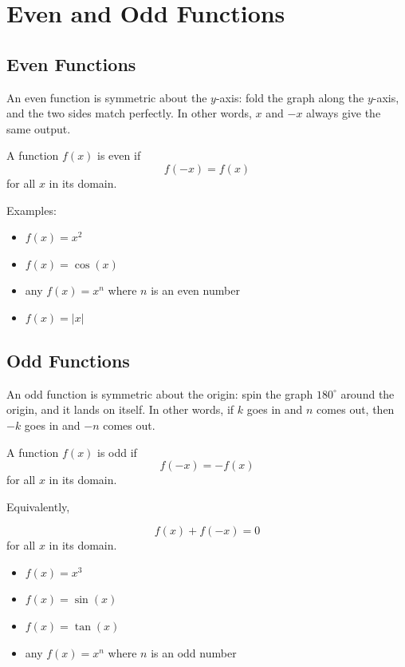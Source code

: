 
\section{Even and Odd Functions}


\subsection{Even Functions}

An even function is symmetric about the $y$-axis:
fold the graph along the $y$-axis, and the two sides match perfectly. In
other words, $x$ and $-x$ always give the same output.


\begin{mdframed}[style=important, frametitle={Even Functions}]

  A function \( f(x) \) is even if
  \[
    f(-x) = f(x)
  \]
  for all \( x \) in its domain.
\end{mdframed}
Examples:
\begin{itemize}
  \item \( f(x) = x^2 \)
  \item \( f(x) = \cos(x) \)
  \item any \( f(x) = x^n \) where \( n \) is an even number
  \item \( f(x) = |x| \)
\end{itemize}

\subsection{Odd Functions}

An odd function is symmetric about the origin: spin
the graph $180^\circ$ around the origin, and it lands on itself. In other
words, if $k$ goes in and $n$ comes out, then $-k$ goes in and $-n$ comes
out.


\begin{mdframed}[style=important, frametitle={Odd Functions}]

  A function \( f(x) \) is odd if
  \[
    f(-x) = -f(x)
  \]
  for all \( x \) in its domain.

  Equivalently,

  \[ f(x) + f(-x) = 0 \]
  for all \( x \) in its domain.
\end{mdframed}

\begin{itemize}

  \item \( f(x) = x^3 \)
  \item \( f(x) = \sin(x) \)
  \item \( f(x) = \tan(x) \)
  \item any \( f(x) = x^n \) where \( n \) is an odd number
\end{itemize}

